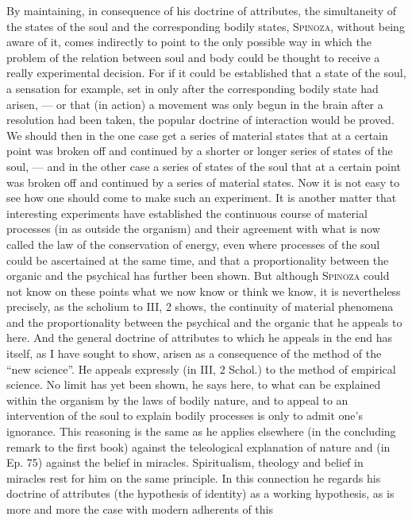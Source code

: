 \documentclass[12pt]{article}
\newcommand{\opage}[1]{\marginnote{\footnotesize\textit{[#1]}}}
\begin{document}
By maintaining, in consequence of his doctrine of attributes, the simultaneity of the states of
the soul and the corresponding bodily states, \textsc{Spinoza}, without being aware of it,
comes indirectly to point to the only possible way in which the problem of the relation between
soul and body could be thought to receive a really experimental decision. For if it could be
established that a state of the soul, a sensation for example, set in only after the
corresponding bodily state had arisen, --- or that (in action) a movement was only begun in the
brain after a resolution had been taken, the popular doctrine of interaction would be proved.
We should then in the one case get a series of material states that at a certain point was
broken off and continued by a shorter or longer series of states of the soul, --- and in the
other case a series of states of the soul that at a certain point was broken off and continued
by a series of material states. Now it is not \opage{60}easy to see how one should come to
make such an experiment. It is another matter that interesting experiments have established the
continuous course of material processes (in as outside the organism) and their agreement with
what is now called the law of the conservation of energy, even where processes of the soul
could be ascertained at the same time, and that a proportionality between the organic and the
psychical has further been shown. But although \textsc{Spinoza} could not know on these points
what we now know or think we know, it is nevertheless precisely, as the scholium to III, 2 shows,
the continuity of material phenomena and the proportionality between the psychical and the
organic that he appeals to here. And the general doctrine of attributes to which he appeals in
the end has itself, as I have sought to show, arisen as a consequence of the method of the ``new
science''. He appeals expressly (in III, 2 Schol.) to the method of empirical science. No limit
has yet been shown, he says here, to what can be explained within the organism by the laws of
bodily nature, and to appeal to an intervention of the soul to explain bodily processes is only
to admit one's ignorance. This reasoning is the same as he applies elsewhere (in the concluding
remark to the first book) against the teleological explanation of nature and (in Ep. 75)
against the belief in miracles. Spiritualism, theology and belief in miracles rest for him on the
same principle. In this connection he regards his doctrine of attributes (the hypothesis of
identity) as a working hypothesis, as is more and more the case with modern adherents of this
\end{document}
